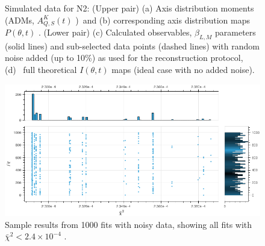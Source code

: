 \documentclass[10pt]{article}
\begin{document}
\begin{figure}[]
\begin{center}
\caption{Simulated data for N2: (Upper pair) (a) Axis distribution moments (ADMs, \(A^{K}_{Q,S}(t)\) ) and (b) corresponding axis distribution maps \(P(\theta, t)\) . (Lower pair) (c) Calculated observables, \(\beta_{L,M}\) parameters (solid lines) and sub-selected data points (dashed lines) with random noise added (up to 10\%) as used for the reconstruction protocol, (d)  full theoretical \(I(\theta,t)\) maps (ideal case with no added noise).\label{720080}}
\end{center}
\end{figure}



\begin{figure}[]
\begin{center}
\includegraphics[width=\textwidth,height=\dimexpr\textheight-4\baselineskip-\abovecaptionskip-\belowcaptionskip\relax,keepaspectratio]{figures/dataDump_1000fitTests_multiFit_noise_051021_fitHistPlot_100323_10-07-34.png}
\caption{Sample results from 1000 fits with noisy data, showing all fits with \(\bar{\chi}^2 < 2.4\times10^{-4}\) .\label{509194}}
\end{center}
\end{figure}
\end{document}
